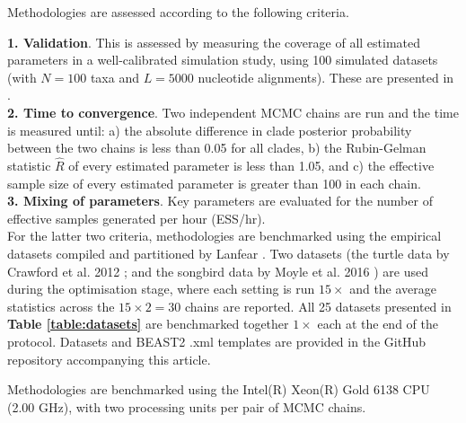 \documentclass[10pt,letterpaper]{article}
\begin{document}
Methodologies are assessed according to the following criteria.


\textbf{1. Validation}. This is assessed by measuring the coverage of all estimated parameters in a well-calibrated simulation study, using 100 simulated datasets (with $N=100$ taxa and $L=5000$ nucleotide alignments). These are presented in \textbf{}. \\

\textbf{2. Time to convergence}. Two independent MCMC chains are run and the time is measured until: a) the absolute difference in clade posterior probability between the two chains is less than 0.05 for all clades, b) the Rubin-Gelman statistic $\hat{R}$ \cite{gelman1992inference} of every estimated parameter is less than 1.05, and c) the effective sample size \cite{rambaut2018posterior} of every estimated parameter is greater than 100 in each chain. \\

\textbf{3. Mixing of parameters}. Key parameters are evaluated for the number of effective samples generated per hour (ESS/hr). \\


For the latter two criteria, methodologies are benchmarked using the empirical datasets compiled and partitioned \cite{lanfear2016partitionfinder} by Lanfear \cite{lanfear2019Github}. Two datasets (the turtle data by Crawford et al. 2012 \cite{Crawford_2012}; and the songbird data by Moyle et al. 2016 \cite{Moyle_2016}) are used during the optimisation stage, where each setting is run $15 \times$ and the average statistics across the $15 \times 2 = 30$ chains are reported. All 25 datasets presented in \textbf{Table \ref{table:datasets}} are benchmarked together $1 \times$ each at the end of the protocol. Datasets and BEAST2 .xml templates are provided in the GitHub repository accompanying this article.


Methodologies are benchmarked using the Intel(R) Xeon(R) Gold 6138 CPU (2.00 GHz), with two processing units per pair of MCMC chains.
\end{document}
